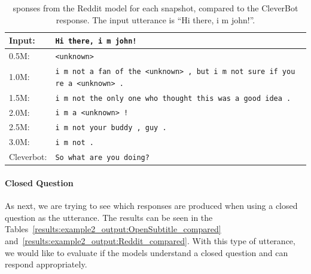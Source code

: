 \begin{table}[H]
	\centering
	\begin{adjustbox}{max width=\textwidth}
		\begin{tabular}{ll}
			\toprule
			Input: 	& \texttt{Hi there, i m john!}\\
			\midrule
			0.5M:	& \texttt{<unknown>}\\
			1.0M: 	& \texttt{i m not a fan of the <unknown> , but i m not sure if you re a <unknown> .}\\
			1.5M: 	& \texttt{i m not the only one who thought this was a good idea .}\\
			2.0M:	& \texttt{i m a <unknown> !}\\
			2.5M:	& \texttt{i m not your buddy , guy .}\\
			3.0M:	& \texttt{i m not .}\\
			Cleverbot:	& \texttt{So what are you doing?}\\
			\bottomrule
		\end{tabular}
	\end{adjustbox}
	\caption{sponses from the Reddit model for each snapshot, compared to the CleverBot response. The input utterance is ``Hi there, i m john!''.}
	\label{results:example1_output:Reddit_compared}
\end{table}

\paragraph{Closed Question} As next, we are trying to see which responses are produced when using a closed question as the utterance. The results can be seen in the Tables~\ref{results:example2_output:OpenSubtitle_compared} and~\ref{results:example2_output:Reddit_compared}. With this type of utterance, we would like to evaluate if the models understand a closed question and can respond appropriately.

